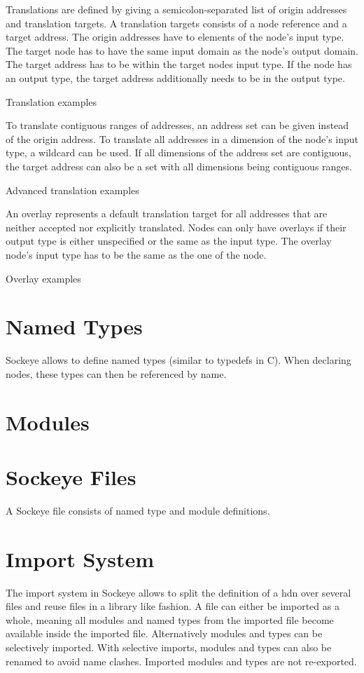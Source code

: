 \documentclass[a4paper,11pt,twoside]{report}
\begin{document}
{{{Translations are defined by giving a semicolon-separated list of origin addresses and translation targets.
A translation targets consists of a node reference and a target address.
The origin addresses have to elements of the node's input type.
The target node has to have the same input domain as the node's output domain.
The target address has to be within the target nodes input type.
If the node has an output type, the target address additionally needs to be in the output type.
\begin{example}
Translation examples
\end{example}

To translate contiguous ranges of addresses, an address set can be given instead of the origin address.
To translate all addresses in a dimension of the node's input type, a wildcard can be used.
If all dimensions of the address set are contiguous, the target address can also be a set with all dimensions being contiguous ranges.
\begin{example}
Advanced translation examples
\end{example}

An overlay represents a default translation target for all addresses that are neither accepted nor explicitly translated.
Nodes can only have overlays if their output type is either unspecified or the same as the input type.
The overlay node's input type has to be the same as the one of the node.
\begin{example}
Overlay examples
\end{example}


\section{Named Types}
Sockeye allows to define named types (similar to typedefs in C).
When declaring nodes, these types can then be referenced by name.

\section{Modules}

\section{Sockeye Files}
A Sockeye file consists of named type and module definitions.

\section{Import System}
The import system in Sockeye allows to split the definition of a \gls{hdn} over several files and reuse files in a library like fashion.
A file can either be imported as a whole, meaning all modules and named types from the imported file become available inside the imported file.
Alternatively modules and types can be selectively imported.
With selective imports, modules and types can also be renamed to avoid name clashes.
Imported modules and types are not re-exported.

}}}
\end{document}
